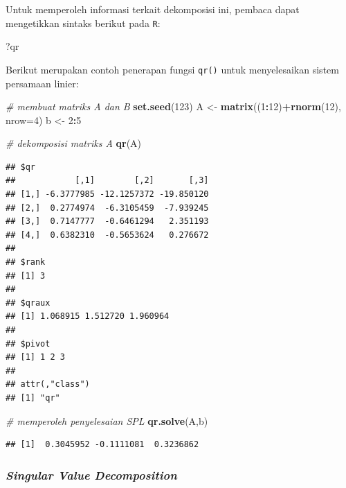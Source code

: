 \documentclass[]{book}
\newenvironment{Shaded}{\begin{snugshade}}{\end{snugshade}}
\newcommand{\CommentTok}[1]{\textcolor[rgb]{0.56,0.35,0.01}{\textit{#1}}}
\newcommand{\DataTypeTok}[1]{\textcolor[rgb]{0.13,0.29,0.53}{#1}}
\newcommand{\DecValTok}[1]{\textcolor[rgb]{0.00,0.00,0.81}{#1}}
\newcommand{\KeywordTok}[1]{\textcolor[rgb]{0.13,0.29,0.53}{\textbf{#1}}}
\newcommand{\NormalTok}[1]{#1}
\newcommand{\OperatorTok}[1]{\textcolor[rgb]{0.81,0.36,0.00}{\textbf{#1}}}
\newcommand{\StringTok}[1]{\textcolor[rgb]{0.31,0.60,0.02}{#1}}
\theoremstyle{definition}
\theoremstyle{definition}
\theoremstyle{definition}
\theoremstyle{remark}
\begin{document}
Untuk memperoleh informasi terkait dekomposisi ini, pembaca dapat mengetikkan sintaks berikut pada \texttt{R}:

\begin{Shaded}
\begin{Highlighting}[]
\NormalTok{?qr}
\end{Highlighting}
\end{Shaded}

Berikut merupakan contoh penerapan fungsi \texttt{qr()} untuk menyelesaikan sistem persamaan linier:

\begin{Shaded}
\begin{Highlighting}[]
\CommentTok{# membuat matriks A dan B}
\KeywordTok{set.seed}\NormalTok{(}\DecValTok{123}\NormalTok{)}
\NormalTok{A <-}\StringTok{ }\KeywordTok{matrix}\NormalTok{((}\DecValTok{1}\OperatorTok{:}\DecValTok{12}\NormalTok{)}\OperatorTok{+}\KeywordTok{rnorm}\NormalTok{(}\DecValTok{12}\NormalTok{), }\DataTypeTok{nrow=}\DecValTok{4}\NormalTok{)}
\NormalTok{b <-}\StringTok{ }\DecValTok{2}\OperatorTok{:}\DecValTok{5}

\CommentTok{# dekomposisi matriks A}
\KeywordTok{qr}\NormalTok{(A)}
\end{Highlighting}
\end{Shaded}

\begin{verbatim}
## $qr
##            [,1]        [,2]       [,3]
## [1,] -6.3777985 -12.1257372 -19.850120
## [2,]  0.2774974  -6.3105459  -7.939245
## [3,]  0.7147777  -0.6461294   2.351193
## [4,]  0.6382310  -0.5653624   0.276672
## 
## $rank
## [1] 3
## 
## $qraux
## [1] 1.068915 1.512720 1.960964
## 
## $pivot
## [1] 1 2 3
## 
## attr(,"class")
## [1] "qr"
\end{verbatim}

\begin{Shaded}
\begin{Highlighting}[]
\CommentTok{# memperoleh penyelesaian SPL}
\KeywordTok{qr.solve}\NormalTok{(A,b)}
\end{Highlighting}
\end{Shaded}

\begin{verbatim}
## [1]  0.3045952 -0.1111081  0.3236862
\end{verbatim}

\hypertarget{svddecomp}{%
\subsubsection{\texorpdfstring{\emph{Singular Value Decomposition}}{Singular Value Decomposition}}\label{svddecomp}}
\end{document}
